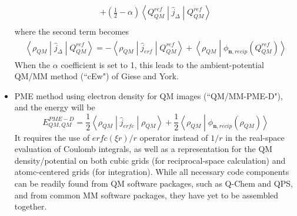 \documentclass[aip,jcp,preprint,superscriptaddress,amsmath,amssymb]{revtex4-1}
\begin{document}
\begin{itemize}
\begin{eqnarray}
+ ( \frac{1}{2} -  \alpha)   \left< Q_{QM}^{ref} \middle| \hat{j}_ {\Delta} \middle| Q_{QM}^{ref} \right>  \nonumber \\
 \label{eq:PMEwq}  
\end{eqnarray} 
where the second term becomes
\begin{eqnarray}
\left< \rho_{QM}  \middle| \hat{j}_ {\Delta} \middle| Q_{QM}^{ref}  \right>  =  - \left< \rho_{QM}  \middle|  \hat{j}_{erf}  \middle| Q_{QM}^{ref} \right> + \left< \rho_{QM}  \middle|  \phi_ {\mathbf{n}, recip} (Q_{QM}^{ref} ) \right>
\end{eqnarray}
When the $\alpha$ coefficient is set to 1, this leads to the ambient-potential QM/MM method (``cEw")  of Giese and York.  
\item PME method using electron density for QM images (``QM/MM-PME-D"), and the energy will be 
\begin{equation}
E_{QM,QM}^{PME-D} = \frac{1}{2} \left< \rho_{QM}  \middle|  \hat{j}_{erfc}  \middle| \rho_{QM} \right> + \frac{1}{2}  \left< \rho_{QM}  \middle|  \phi_ {\mathbf{n}, recip} (\rho_{QM}) \right>   
\end{equation} 
It requires the use of $erfc(\xi r ) / r$ operator instead of $1/r$ in the real-space evaluation of Coulomb integrals, 
as well as a representation for the QM density/potential on both cubic grids (for reciprocal-space calculation) and atomc-centered grids (for integration).  
While all necessary code components can be readily found from QM software packages, such as Q-Chem and QPS, 
and from common MM software packages, they have yet to be assembled together.  
\end{itemize}

\clearpage 
\end{document}
